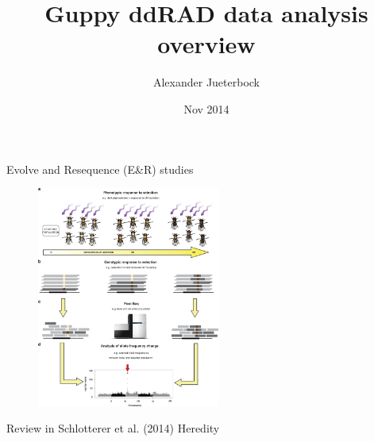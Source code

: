 \documentclass[presentation]{beamer}
\author{Alexander Jueterbock}
\date{Nov 2014}
\title{Guppy ddRAD data analysis overview}
\begin{document}
\maketitle



\begin{frame}[label=sec-1]{Evolve and Resequence (E\&R) studies}
\begin{figure}[htb]
\centering
\includegraphics[width=6cm]{ERStudies.jpg}
\end{figure}
Review in Schlotterer et al. (2014)  Heredity
\end{frame}
\end{document}
